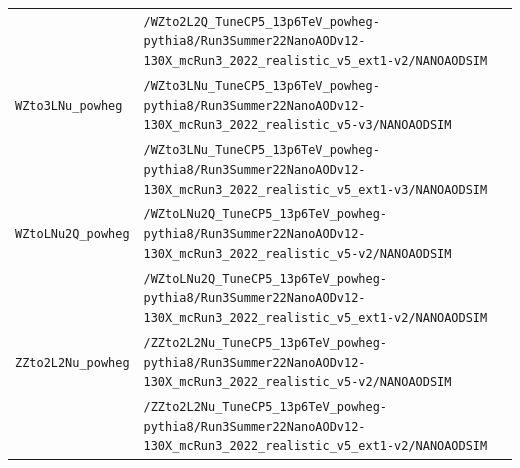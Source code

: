 \begin{longtable}{@{}>{\RaggedRight\arraybackslash}p{} >{\RaggedRight\arraybackslash}p{}@{}}
 & \texttt{/\allowbreak{}WZto2L2Q\_\allowbreak{}TuneCP5\_\allowbreak{}13p6TeV\_\allowbreak{}powheg-\allowbreak{}pythia8/\allowbreak{}Run3Summer22NanoAODv12-\allowbreak{}130X\_\allowbreak{}mcRun3\_\allowbreak{}2022\_\allowbreak{}realistic\_\allowbreak{}v5\_\allowbreak{}ext1-\allowbreak{}v2/\allowbreak{}NANOAODSIM} \\
\addlinespace[2pt]
\texttt{WZto3LNu\_\allowbreak{}powheg} & \texttt{/\allowbreak{}WZto3LNu\_\allowbreak{}TuneCP5\_\allowbreak{}13p6TeV\_\allowbreak{}powheg-\allowbreak{}pythia8/\allowbreak{}Run3Summer22NanoAODv12-\allowbreak{}130X\_\allowbreak{}mcRun3\_\allowbreak{}2022\_\allowbreak{}realistic\_\allowbreak{}v5-\allowbreak{}v3/\allowbreak{}NANOAODSIM} \\
 & \texttt{/\allowbreak{}WZto3LNu\_\allowbreak{}TuneCP5\_\allowbreak{}13p6TeV\_\allowbreak{}powheg-\allowbreak{}pythia8/\allowbreak{}Run3Summer22NanoAODv12-\allowbreak{}130X\_\allowbreak{}mcRun3\_\allowbreak{}2022\_\allowbreak{}realistic\_\allowbreak{}v5\_\allowbreak{}ext1-\allowbreak{}v3/\allowbreak{}NANOAODSIM} \\
\addlinespace[2pt]
\texttt{WZtoLNu2Q\_\allowbreak{}powheg} & \texttt{/\allowbreak{}WZtoLNu2Q\_\allowbreak{}TuneCP5\_\allowbreak{}13p6TeV\_\allowbreak{}powheg-\allowbreak{}pythia8/\allowbreak{}Run3Summer22NanoAODv12-\allowbreak{}130X\_\allowbreak{}mcRun3\_\allowbreak{}2022\_\allowbreak{}realistic\_\allowbreak{}v5-\allowbreak{}v2/\allowbreak{}NANOAODSIM} \\
 & \texttt{/\allowbreak{}WZtoLNu2Q\_\allowbreak{}TuneCP5\_\allowbreak{}13p6TeV\_\allowbreak{}powheg-\allowbreak{}pythia8/\allowbreak{}Run3Summer22NanoAODv12-\allowbreak{}130X\_\allowbreak{}mcRun3\_\allowbreak{}2022\_\allowbreak{}realistic\_\allowbreak{}v5\_\allowbreak{}ext1-\allowbreak{}v2/\allowbreak{}NANOAODSIM} \\
\addlinespace[2pt]
\texttt{ZZto2L2Nu\_\allowbreak{}powheg} & \texttt{/\allowbreak{}ZZto2L2Nu\_\allowbreak{}TuneCP5\_\allowbreak{}13p6TeV\_\allowbreak{}powheg-\allowbreak{}pythia8/\allowbreak{}Run3Summer22NanoAODv12-\allowbreak{}130X\_\allowbreak{}mcRun3\_\allowbreak{}2022\_\allowbreak{}realistic\_\allowbreak{}v5-\allowbreak{}v2/\allowbreak{}NANOAODSIM} \\
 & \texttt{/\allowbreak{}ZZto2L2Nu\_\allowbreak{}TuneCP5\_\allowbreak{}13p6TeV\_\allowbreak{}powheg-\allowbreak{}pythia8/\allowbreak{}Run3Summer22NanoAODv12-\allowbreak{}130X\_\allowbreak{}mcRun3\_\allowbreak{}2022\_\allowbreak{}realistic\_\allowbreak{}v5\_\allowbreak{}ext1-\allowbreak{}v2/\allowbreak{}NANOAODSIM} \\

\end{longtable}
